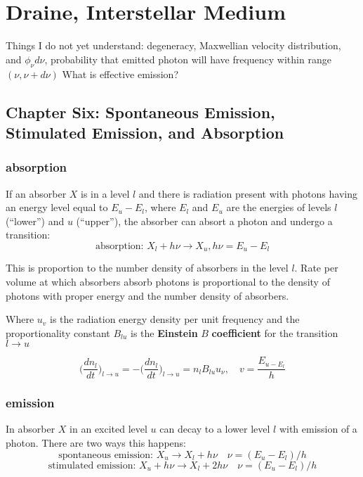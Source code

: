 \section{Draine, Interstellar Medium}
Things I do not yet understand: degeneracy, Maxwellian velocity distribution, and $ \phi_{\nu}d\nu $, probability that emitted photon will have frequency within range $ (\nu,\nu+d\nu) $ What is effective emission?

\subsection{Chapter Six: Spontaneous Emission, Stimulated Emission, and Absorption}

\subsubsection{absorption}

If an absorber $ X $ is in a level $ l $ and there is radiation present with photons having an energy level equal to $ E_{u}-E_{l} $, where $ E_{l} $ and $ E_{u} $ are the energies of levels $ l $ (``lower'') and $ u $ (``upper''), the absorber can absort a photon and undergo a transition:
\begin{equation}
  \text{absorption: } X_{l}+h\nu\to X_{u}, h\nu = E_{u}-E_{l}
\end{equation}

This is proportion to the number density of absorbers in the level $ l $. Rate per volume at which absorbers absorb photons is proportional to the density of photons with proper energy and the number density of absorbers.

Where $ u_{v} $ is the radiation energy density per unit frequency and the proportionality constant $ B_{lu} $ is the \textbf{Einstein} $ B $ \textbf{coefficient} for the transition $ l\to u $ 

\begin{equation} 
  \big(\frac{dn_{l}}{dt}\big)_{l\to u}= -\big(\frac{dn_{l}}{dt}\big)_{l\to u} = n_{l}B_{lu}u_{\nu},\quad v=\frac{E_{u-E_{l}}}{h}
\end{equation}
\subsubsection{emission}

In absorber $ X $ in an excited level $ u $ can decay to a lower level $ l $ with emission of a photon. There are two ways this happens:
\begin{equation}
  \text{spontaneous emission: } X_{u}\to X_{l}+h\nu \quad \nu=(E_{u}-E_{l})/h
\end{equation}
\begin{equation}
  \text{stimulated emission: } X_{u}+h\nu\to X_{l}+2h\nu\quad \nu=(E_{u}-E_{l})/h
\end{equation}

